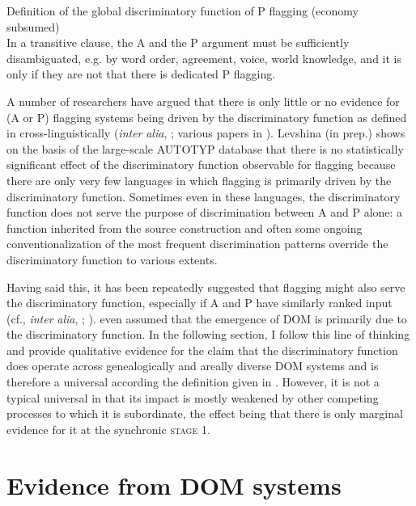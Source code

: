 \documentclass[output=paper]{langsci/langscibook}
\begin{document}
\ea\label{ex:serzant:3}
Definition of the global discriminatory function of P flagging (economy subsumed)\\
In a transitive clause, the A and the P argument must be sufficiently disambiguated, e.g. by word order, agreement, voice, world knowledge, and it is only if they are not that there is dedicated P flagging.\\
\z

A number of researchers have argued that there is only little or no evidence for (A or P) flagging systems being driven by the discriminatory function as defined in  cross-linguistically (\textit{inter} \textit{alia}, \citealt{Aissen2003,Malchukov2008}; various papers in \citealt{deHoopdeSwart2009}). Levshina (in prep.) shows on the basis of the large-scale AUTOTYP database that there is no statistically significant effect of the discriminatory function observable for flagging because there are only very few languages in which flagging is primarily driven by the discriminatory function. Sometimes even in these languages, the discriminatory function does not serve the purpose of discrimination between A and P alone: a function inherited from the source construction and often some ongoing conventionalization of the most frequent discrimination patterns override the discriminatory function to various extents. 

Having said this, it has been repeatedly suggested that flagging might also serve the discriminatory function, especially if A and P have similarly ranked input (cf., \textit{inter} \textit{alia}, \citealt{Comrie1978,Comrie1989}; \citealt{Dixon1994,Silverstein1976,Kibrik1997}). \citet[117]{Bossong1985} even assumed that the emergence of DOM is primarily due to the discriminatory function. In the following section, I follow this line of thinking and provide qualitative evidence for the claim that the discriminatory function does operate across genealogically and areally diverse DOM systems and is therefore a universal according the definition given in . However, it is not a typical universal in that its impact is mostly weakened by other competing processes to which it is subordinate, the effect being that there is only marginal evidence for it at the synchronic \textsc{stage} 1.

\section{Evidence from DOM systems}\label{sec:serzant:3}
\end{document}
